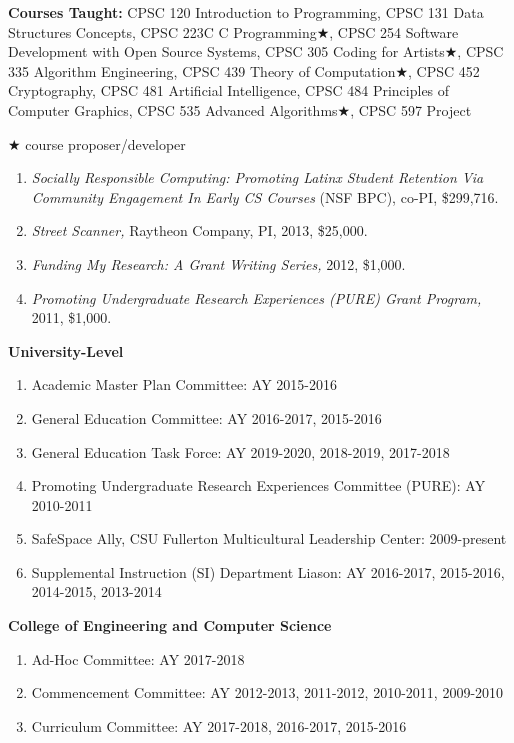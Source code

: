 \documentclass[11pt]{letter}
\begin{document}
\renewcommand{\labelenumi}{\arabic{enumi}.}


\textbf{Courses Taught:}
 CPSC 120 Introduction to Programming,
 CPSC 131 Data Structures Concepts,
 CPSC 223C C Programming$\bigstar$,
 CPSC 254 Software Development with Open Source Systems,
 CPSC 305 Coding for Artists$\bigstar$,
 CPSC 335 Algorithm Engineering,
 CPSC 439 Theory of Computation$\bigstar$,
 CPSC 452 Cryptography,
 CPSC 481 Artificial Intelligence,
 CPSC 484 Principles of Computer Graphics,
 CPSC 535 Advanced Algorithms$\bigstar$,
 CPSC 597 Project

 $\bigstar$ course proposer/developer


\begin{enumerate}
\item \emph{Socially Responsible Computing: Promoting Latinx Student Retention Via Community Engagement In Early CS Courses} (NSF BPC), co-PI, \$299,716.
\item \emph{Street Scanner,} Raytheon Company, PI, 2013, \$25,000.
\item \emph{Funding My Research: A Grant Writing Series,} 2012, \$1,000.
\item \emph{Promoting Undergraduate Research Experiences (PURE) Grant Program,} 2011, \$1,000.
\end{enumerate}


\textbf{University-Level}
\begin{enumerate}
\item Academic Master Plan Committee: AY 2015-2016
\item General Education Committee: AY 2016-2017, 2015-2016
\item General Education Task Force: AY 2019-2020, 2018-2019, 2017-2018
\item Promoting Undergraduate Research Experiences Committee (PURE): AY 2010-2011
\item SafeSpace Ally, CSU Fullerton Multicultural Leadership Center: 2009-present
\item Supplemental Instruction (SI) Department Liason: AY 2016-2017, 2015-2016, 2014-2015, 2013-2014
\end{enumerate}

\textbf{College of Engineering and Computer Science}
\begin{enumerate}
\item Ad-Hoc Committee: AY 2017-2018
\item Commencement Committee: AY 2012-2013, 2011-2012, 2010-2011, 2009-2010
\item Curriculum Committee: AY 2017-2018, 2016-2017, 2015-2016
\end{enumerate}
\end{document}
